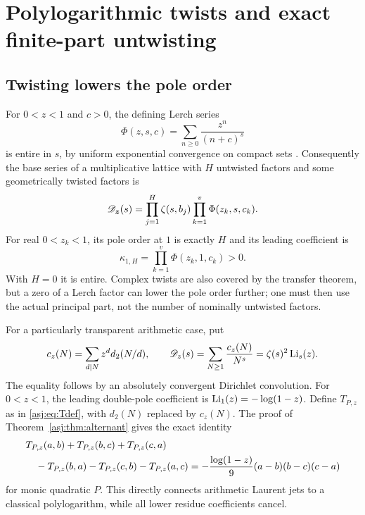 \section{Polylogarithmic twists and exact finite-part untwisting}
\label{asj:sec:twists}

\subsection{Twisting lowers the pole order}
For $0<z<1$ and $c>0$, the defining Lerch series
\[
 \Phi(z,s,c)=\sum_{n\ge0}\frac{z^n}{(n+c)^s}
\]
is entire in $s$, by uniform exponential convergence on compact sets
\cite{dlmf-lerch}. Consequently the base series of a multiplicative lattice
with $H$ untwisted factors and some geometrically twisted factors is
\begin{equation}\label{asj:eq:twistedbase}
 \mathscr D_{\boldsymbol z}(s)=
      \prod_{j=1}^H\zeta(s,b_j)\prod_{k=1}^v\Phi(z_k,s,c_k).
\end{equation}
For real $0<z_k<1$, its pole order at $1$ is exactly $H$ and its leading
coefficient is
\[
 \kappa_{1,H}=\prod_{k=1}^v\Phi(z_k,1,c_k)>0.
\]
With $H=0$ it is entire. Complex twists are also covered by the transfer
theorem, but a zero of a Lerch factor can lower the pole order further;
one must then use the actual principal part, not the number of nominally
untwisted factors.

For a particularly transparent arithmetic case, put
\begin{equation}\label{asj:eq:cz}
 c_z(N)=\sum_{d\mid N}z^d d_2(N/d),\qquad
 \mathscr D_z(s)=\sum_{N\ge1}\frac{c_z(N)}{N^s}
                         =\zeta(s)^2\operatorname{Li}_s(z).
\end{equation}
The equality follows by an absolutely convergent Dirichlet convolution.
For $0<z<1$, the leading double-pole coefficient is
$\operatorname{Li}_1(z)=-\log(1-z)$. Define $T_{P,z}$ as in \eqref{asj:eq:Tdef}, with
$d_2(N)$ replaced by $c_z(N)$. The proof of Theorem~\ref{asj:thm:alternant}
gives the exact identity
\begin{align}\label{asj:eq:twisted-six}
 &T_{P,z}(a,b)+T_{P,z}(b,c)+T_{P,z}(c,a)\notag\\
 &\quad-T_{P,z}(b,a)-T_{P,z}(c,b)-T_{P,z}(a,c)
    =-\frac{\log(1-z)}9(a-b)(b-c)(c-a)
\end{align}
for monic quadratic $P$. This directly connects arithmetic Laurent jets
to a classical polylogarithm, while all lower residue coefficients cancel.

